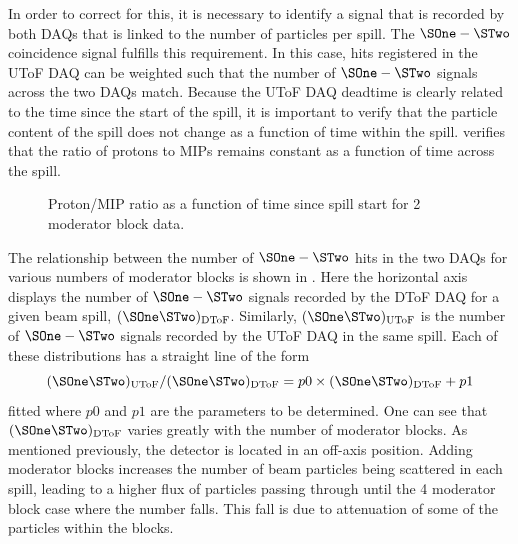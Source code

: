 In order to correct for this, it is necessary to identify a signal that is recorded by both DAQs that is linked to the number of particles per spill.
The $\SOne-\STwo$ coincidence signal fulfills this requirement.
In this case, hits registered in the UToF DAQ can be weighted such that the number of $\SOne-\STwo$ signals across the two DAQs match.
Because the UToF DAQ deadtime is clearly related to the time since the start of the spill, it is important to verify that the particle content of the spill does not change as a function of time within the spill.
 verifies that the ratio of protons to MIPs remains constant as a function of time across the spill.

\begin{figure}[h]
  \begin{adjustbox}{max totalsize=.75\textwidth, center}
    
  \end{adjustbox}
  \caption[Proton/MIP ratio as a function of time since spill start]{Proton/MIP ratio as a function of time since spill start for 2 moderator block data.}
  \label{fig:proMipRatio}
\end{figure}

The relationship between the number of $\SOne-\STwo$ hits in the two DAQs for various numbers of moderator blocks is shown in .
Here the horizontal axis displays the number of $\SOne-\STwo$ signals recorded by the DToF DAQ for a given beam spill, $(\SOne\STwo)_{\text{DToF}}$.
Similarly, $(\SOne\STwo)_{\text{UToF}}$ is the number of $\SOne-\STwo$ signals recorded by the UToF DAQ in the same spill.
Each of these distributions has a straight line of the form
\begin{equation}
  (\SOne\STwo)_{\text{UToF}}/(\SOne\STwo)_{\text{DToF}} = p0 \times (\SOne\STwo)_{\text{DToF}} + p1
\end{equation}
fitted where $p0$ and $p1$ are the parameters to be determined.
One can see that $(\SOne \STwo)_{\text{DToF}}$ varies greatly with the number of moderator blocks. 
As mentioned previously, the \STwo detector is located in an off-axis position.
Adding moderator blocks increases the number of beam particles being scattered in each spill, leading to a higher flux of particles passing through \STwo until the 4 moderator block case where the number falls.
This fall is due to attenuation of some of the particles within the blocks.

